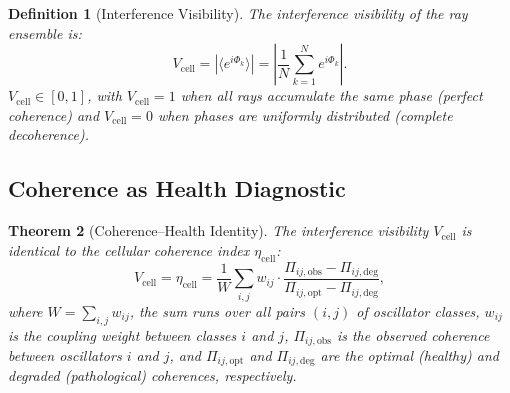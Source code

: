 \documentclass[11pt,twocolumn,a4paper]{article}
\newtheorem{theorem}{Theorem}[section]
\newtheorem{definition}[theorem]{Definition}
\newcommand{\etacell}{\eta_{\mathrm{cell}}}
\newcommand{\Vcell}{V_{\mathrm{cell}}}
\begin{document}
\begin{definition}[Interference Visibility]
\label{def:visibility}
The interference visibility of the ray ensemble is:
\begin{equation}
\Vcell = \left| \langle e^{i\Phi_k} \rangle \right|
  = \left| \frac{1}{N} \sum_{k=1}^{N} e^{i\Phi_k} \right|.
\label{eq:visibility}
\end{equation}
$\Vcell \in [0, 1]$, with $\Vcell = 1$ when all rays accumulate
the same phase (perfect coherence) and $\Vcell = 0$ when phases are
uniformly distributed (complete decoherence).
\end{definition}

\subsection{Coherence as Health Diagnostic}

\begin{theorem}[Coherence--Health Identity]
\label{thm:coherence-health}
The interference visibility $\Vcell$ is identical to the cellular
coherence index $\etacell$:
\begin{equation}
\boxed{
\Vcell = \etacell = \frac{1}{W} \sum_{i,j} w_{ij} \cdot
  \frac{\Pi_{ij,\mathrm{obs}} - \Pi_{ij,\mathrm{deg}}}
  {\Pi_{ij,\mathrm{opt}} - \Pi_{ij,\mathrm{deg}}},
}
\label{eq:coherence-health}
\end{equation}
where $W = \sum_{i,j} w_{ij}$, the sum runs over all pairs $(i,j)$
of oscillator classes, $w_{ij}$ is the coupling weight between classes
$i$ and $j$, $\Pi_{ij,\mathrm{obs}}$ is the observed coherence between
oscillators $i$ and $j$, and $\Pi_{ij,\mathrm{opt}}$ and
$\Pi_{ij,\mathrm{deg}}$ are the optimal (healthy) and degraded
(pathological) coherences, respectively.
\end{theorem}
\end{document}
